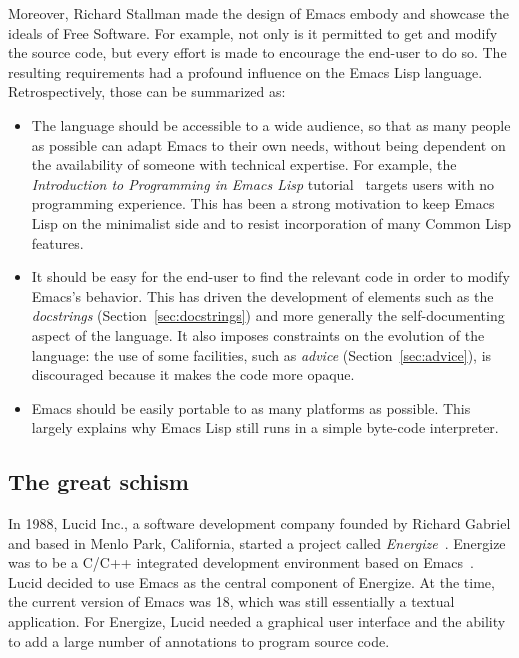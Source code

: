 \documentclass[format=acmsmall, review]{acmart}
\newcommand \Elisp {Emacs Lisp}
\begin{document}
Moreover, Richard Stallman made the design of Emacs embody and showcase
the ideals of Free Software.  For example, not only is it permitted to get
and modify the source code, but every effort is made to encourage the
end-user to do so.  The resulting requirements had a profound influence on
the \Elisp{} language.  Retrospectively, those
can be summarized as:
\begin{itemize}
\item The language should be accessible to a wide audience, so that as many
  people as possible can adapt Emacs to their own needs, without being
  dependent on the availability of someone with technical expertise.
  For example, the
  \emph{Introduction to Programming in Emacs Lisp}
  tutorial~\citep{ElispIntro} targets users with no programming
  experience.  This has been a strong motivation to keep \Elisp{} on the
  minimalist side and to resist incorporation of many Common Lisp features.
\item It should be easy for the end-user to find the relevant code in order
  to modify Emacs's behavior.  This has driven the development of elements
  such as the \emph{docstrings} (Section~\ref{sec:docstrings}) and more generally the self-documenting
  aspect of the language.  It also imposes constraints on the evolution of
  the language: the use of some facilities, such as \emph{advice}
  (Section~\ref{sec:advice}), is
  discouraged because it makes the code more opaque.
\item Emacs should be easily portable to as many platforms as possible.
  This largely explains why \Elisp{} still runs in a simple byte-code interpreter.
\end{itemize}

\subsection{The great schism}
\label{sec:schism}
In 1988, Lucid Inc., a software development company founded by Richard
Gabriel and based in Menlo
Park, California, started a project called \emph{Energize}~\cite{GabrielEtAl1990,Gabriel-personal}.
Energize was to be a C/C++ integrated development environment based on
Emacs~\cite{GabrielLetter}.  Lucid decided to use Emacs as the central
component of Energize.  At the time, the current version of Emacs was
18, which was still essentially a textual application.
For Energize, Lucid needed a graphical user
interface and the ability to add a large number of annotations to
program source code.
\end{document}
